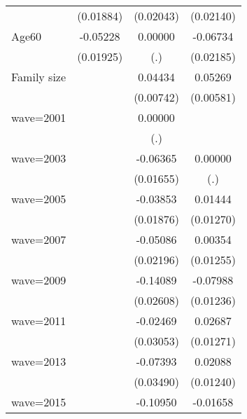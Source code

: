 {\begin{longtable}{l*{3}{c}}
                    &   (0.01884)         &   (0.02043)         &   (0.02140)         \\
\addlinespace
Age60               &    -0.05228\sym{***}&     0.00000         &    -0.06734\sym{***}\\
                    &   (0.01925)         &         (.)         &   (0.02185)         \\
\addlinespace
Family size         &                     &     0.04434\sym{***}&     0.05269\sym{***}\\
                    &                     &   (0.00742)         &   (0.00581)         \\
\addlinespace
wave=2001           &                     &     0.00000         &                     \\
                    &                     &         (.)         &                     \\
\addlinespace
wave=2003           &                     &    -0.06365\sym{***}&     0.00000         \\
                    &                     &   (0.01655)         &         (.)         \\
\addlinespace
wave=2005           &                     &    -0.03853\sym{**} &     0.01444         \\
                    &                     &   (0.01876)         &   (0.01270)         \\
\addlinespace
wave=2007           &                     &    -0.05086\sym{**} &     0.00354         \\
                    &                     &   (0.02196)         &   (0.01255)         \\
\addlinespace
wave=2009           &                     &    -0.14089\sym{***}&    -0.07988\sym{***}\\
                    &                     &   (0.02608)         &   (0.01236)         \\
\addlinespace
wave=2011           &                     &    -0.02469         &     0.02687\sym{**} \\
                    &                     &   (0.03053)         &   (0.01271)         \\
\addlinespace
wave=2013           &                     &    -0.07393\sym{**} &     0.02088\sym{*}  \\
                    &                     &   (0.03490)         &   (0.01240)         \\
\addlinespace
wave=2015           &                     &    -0.10950\sym{***}&    -0.01658         \\

\end{longtable}}
